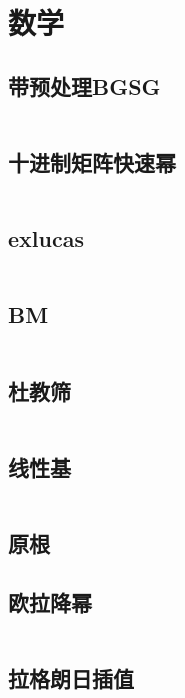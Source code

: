 \documentclass[a4paper,11pt]{article}
\begin{document}
    \newpage
    \section{数学} %

    \subsection{带预处理BGSG}
    \inputminted[breaklines]{c++}{Math/BGSG.cpp}

    \subsection{十进制矩阵快速幂}
    \inputminted[breaklines]{c++}{Math/快速幂.cpp}

    \subsection{exlucas}
    \inputminted[breaklines]{c++}{Math/exlucas.cpp}

    \subsection{BM}
    \inputminted[breaklines]{c++}{Math/BM.cpp}

    \subsection{杜教筛}
    \inputminted[breaklines]{c++}{Math/杜教筛.cpp}

    \subsection{线性基}
    \inputminted[breaklines]{c++}{Math/线性基.cpp}

    \subsection{原根}
    

    \subsection{欧拉降幂}
    \inputminted[breaklines]{c++}{Math/欧拉降幂.cpp}

    \subsection{拉格朗日插值}
    
\end{document}
